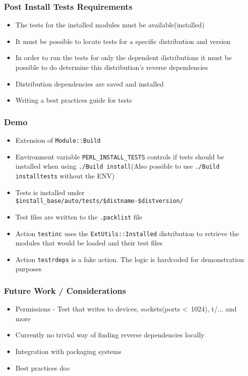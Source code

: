 \documentclass[10pt]{beamer}
\begin{document}
\begin{frame}
\frametitle{Post Install Tests Requirements}
\begin{itemize}
\item The tests for the installed modules must be available(installed)
\item It must be possible to locate tests for a specific distribution and version
\item In order to run the tests for only the dependent distributions it must be possible to do determine this distribution's reverse dependencies
\item Distribution dependencies are saved and installed
\item Writing a best practices guide for tests
\end{itemize}
\end{frame}

\begin{frame}[fragile]
\frametitle{Demo}

\begin{itemize}
\item Extension of \verb|Module::Build|
\item Environment variable \verb|PERL_INSTALL_TESTS| controls if tests should be installed when using  \verb|./Build install|(Also possible to use \verb|./Build installtests| without the ENV)
\item Tests is installed under \verb|$install_base/auto/tests/$distname-$distversion/|
\item Test files are written to the \verb|.packlist| file
\item Action \verb|testinc| uses the \verb|ExtUtils::Installed| distribution to retrieve the modules that would be loaded and their test files
\item Action \verb|testrdeps| is a fake action. The logic is hardcoded for demonstration purposes
\end{itemize}
\end{frame}

\begin{frame}[fragile]
\frametitle{Future Work / Considerations}
\begin{itemize}
\item Permissions - Test that writes to devices, sockets(ports \textless \ 1024), t/... and more
\item Currently no trivial way of finding reverse dependencies locally
\item Integration with packaging systems
\item Best practices doc
\end{itemize}
\end{frame}
\end{document}
